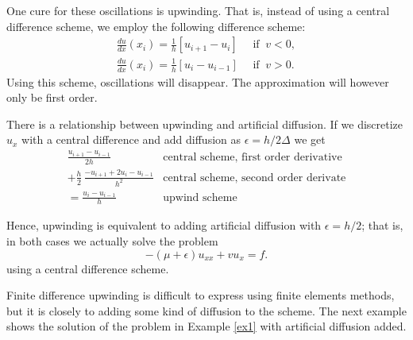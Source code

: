 One cure for these oscillations is upwinding. That is, instead
of using a central difference scheme, we employ the following difference
scheme:   
\begin{eqnarray*}
\frac{du}{dx} (x_i) = \frac{1}{h}[u_{i+1}-u_{i}] \quad   \mbox{ if } \ v < 0, \\ 
\frac{du}{dx} (x_i) = \frac{1}{h}[u_{i}-u_{i-1}] \quad  \mbox{ if } \ v > 0 .  
\end{eqnarray*}
Using this scheme, oscillations will disappear. The approximation will however only be first order.

There is a relationship between upwinding and artificial diffusion.  If we discretize $u_x$ with a central difference and add diffusion as $\epsilon =h/2 \Delta $ we get
\begin{eqnarray*}
 \frac{u_{i+1}  -  u_{i-1}}{2 h}    &  \textrm{central scheme, first order derivative}  \\
+ \frac{h}{2} \, \frac{-u_{i+1}   + 2 u_{i}    -u_{i-1}}{h^2}  &  \textrm{central scheme, second order derivate}   \\
= \frac{u_{i} -u_{i-1}}{h} &  \textrm{upwind scheme}   
\end{eqnarray*}

\noindent
Hence, upwinding is equivalent to adding artificial diffusion with $\epsilon=h/2$; that is, in both cases we actually solve the problem
\[-(\mu+\epsilon)u_{xx} + vu_x = f.\]
using a central difference scheme. 

Finite difference upwinding is difficult to express using finite elements methods, but
it is closely to adding some kind of diffusion to the scheme.  
The next example shows the solution of the problem in Example \ref{ex1} with 
artificial diffusion added. 

